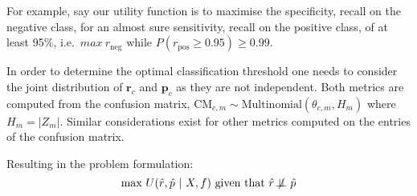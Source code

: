 \documentclass[paper=a4, fontsize=12pt]{scrartcl}
\numberwithin{equation}{section} %
\numberwithin{figure}{section} %
\numberwithin{table}{section} %
\begin{document}
For example, say our utility function is to maximise the specificity, recall on the negative class, for an almost sure sensitivity, recall on the positive class, of at least 95\%, i.e.\ $max~r_{\mathrm{neg}} \textrm{ while } P\left(r_{\mathrm{pos}} \geq 0.95\right) \geq 0.99$.
\par
In order to determine the optimal classification threshold one needs to consider the joint distribution of $\mathbf{r}_{c}$ and $\mathbf{p}_{c}$ as they are not independent.
Both metrics are computed from the confusion matrix, $\mathrm{CM}_{c, m} \sim \mathrm{Multinomial}\left(\theta_{c, m}, H_{m}\right)$ where $H_{m} = |Z_{m}|$.
Similar considerations exist for other metrics computed on the entries of the confusion matrix.

Resulting in the problem formulation:
\begin{equation*}
    \textrm{max}~U(\hat{r}, \hat{p}~|~X, f) \textrm{ given that } \hat{r} \not\!\perp\!\!\!\perp \hat{p}
\end{equation*}
% 
\end{document}
